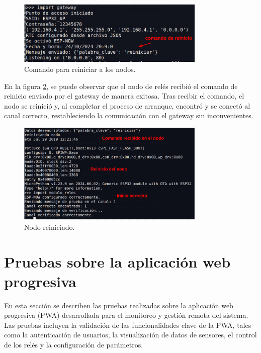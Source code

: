 \begin{itemize}
    
\begin{figure}[H]
\centering 
\includegraphics[width=0.8\textwidth]{./Figures/comando_restart.png}
\caption{Comando para reiniciar a los nodos.}
\label{fig:comando_restart}
\end{figure}

En la figura \ref{fig:nodo_restart}, se puede observar que el nodo de relés recibió el comando de reinicio enviado por el gateway de manera exitosa. Tras recibir el comando, el nodo se reinició y, al completar el proceso de arranque, encontró y se conectó al canal correcto, restableciendo la comunicación con el gateway sin inconvenientes.

\begin{figure}[H]
\centering 
\includegraphics[width=0.8\textwidth]{./Figures/nodo_restart.png}
\caption{Nodo reiniciado.}
\label{fig:nodo_restart}
\end{figure}


    
    
\end{itemize}




\section{Pruebas sobre la aplicación web progresiva}

En esta sección se describen las pruebas realizadas sobre la aplicación web progresiva (PWA) desarrollada para el monitoreo y gestión remota del sistema. Las pruebas incluyen la validación de las funcionalidades clave de la PWA, tales como la autenticación de usuarios, la visualización de datos de sensores, el control de los relés y la configuración de parámetros.

